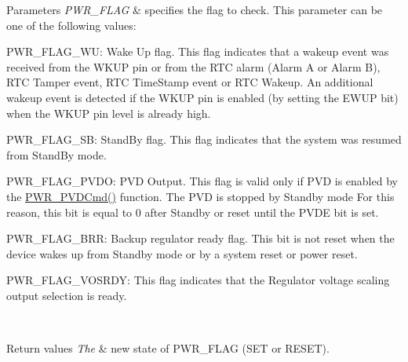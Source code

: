 \begin{DoxyParams}{Parameters}
{\em P\+W\+R\+\_\+\+F\+L\+A\+G} & specifies the flag to check. This parameter can be one of the following values\+: \begin{DoxyItemize}
\item P\+W\+R\+\_\+\+F\+L\+A\+G\+\_\+\+W\+U\+: Wake Up flag. This flag indicates that a wakeup event was received from the W\+K\+U\+P pin or from the R\+T\+C alarm (Alarm A or Alarm B), R\+T\+C Tamper event, R\+T\+C Time\+Stamp event or R\+T\+C Wakeup. An additional wakeup event is detected if the W\+K\+U\+P pin is enabled (by setting the E\+W\+U\+P bit) when the W\+K\+U\+P pin level is already high. \item P\+W\+R\+\_\+\+F\+L\+A\+G\+\_\+\+S\+B\+: Stand\+By flag. This flag indicates that the system was resumed from Stand\+By mode. \item P\+W\+R\+\_\+\+F\+L\+A\+G\+\_\+\+P\+V\+D\+O\+: P\+V\+D Output. This flag is valid only if P\+V\+D is enabled by the \hyperlink{group___p_w_r___group2_ga42cad476b816e0a33594a933b3ed1acd}{P\+W\+R\+\_\+\+P\+V\+D\+Cmd()} function. The P\+V\+D is stopped by Standby mode For this reason, this bit is equal to 0 after Standby or reset until the P\+V\+D\+E bit is set. \item P\+W\+R\+\_\+\+F\+L\+A\+G\+\_\+\+B\+R\+R\+: Backup regulator ready flag. This bit is not reset when the device wakes up from Standby mode or by a system reset or power reset. \item P\+W\+R\+\_\+\+F\+L\+A\+G\+\_\+\+V\+O\+S\+R\+D\+Y\+: This flag indicates that the Regulator voltage scaling output selection is ready. \end{DoxyItemize}
\\
\hline
\end{DoxyParams}

\begin{DoxyRetVals}{Return values}
{\em The} & new state of P\+W\+R\+\_\+\+F\+L\+A\+G (S\+E\+T or R\+E\+S\+E\+T). \\
\hline
\end{DoxyRetVals}
